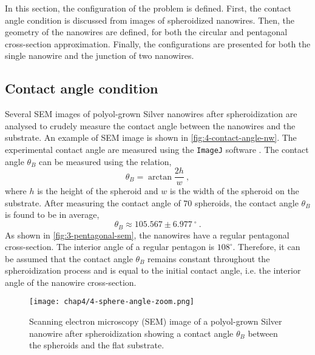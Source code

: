 In this section, the configuration of the problem is defined. First, the contact angle condition is discussed from images of spheroidized nanowires. Then, the geometry of the nanowires are defined, for both the circular and pentagonal cross-section approximation. Finally, the configurations are presented for both the single nanowire and the junction of two nanowires.
\subsection{Contact angle condition}
    Several SEM images of polyol-grown Silver nanowires after spheroidization are analysed to crudely measure the contact angle between the nanowires and the substrate. An example of SEM image is shown in \autoref{fig:4-contact-angle-nw}. The experimental contact angle are measured using the \texttt{ImageJ} software \cite{ImageJ2012}. The contact angle $\theta_B$ can be measured using the relation,
    \begin{equation}
        \theta_B = \arctan{\frac{2 h}{w}}\ ,
    \end{equation}
    where $h$ is the height of the spheroid and $w$ is the width of the spheroid on the substrate.
    After measuring the contact angle of $70$ spheroids, the contact angle $\theta_B$ is found to be in average,
    \begin{equation}
        \theta_B \approx 105.567 \pm 6.977 \ ^\circ\ .
    \end{equation}
    As shown in \autoref{fig:3-pentagonal-sem}, the nanowires have a regular pentagonal cross-section. The interior angle of a regular pentagon is $108^\circ$. Therefore, it can be assumed that the contact angle $\theta_B$ remains constant throughout the spheroidization process and is equal to the initial contact angle, i.e. the interior angle of the nanowire cross-section.
    \begin{figure}[H]
        \centering
        \texttt{[image: chap4/4-sphere-angle-zoom.png]}
        \caption{Scanning electron microscopy (SEM) image of a polyol-grown Silver nanowire after spheroidization showing a contact angle $\theta_B$ between the spheroids and the flat substrate.}
        \label{fig:4-contact-angle-nw}
    \end{figure}

